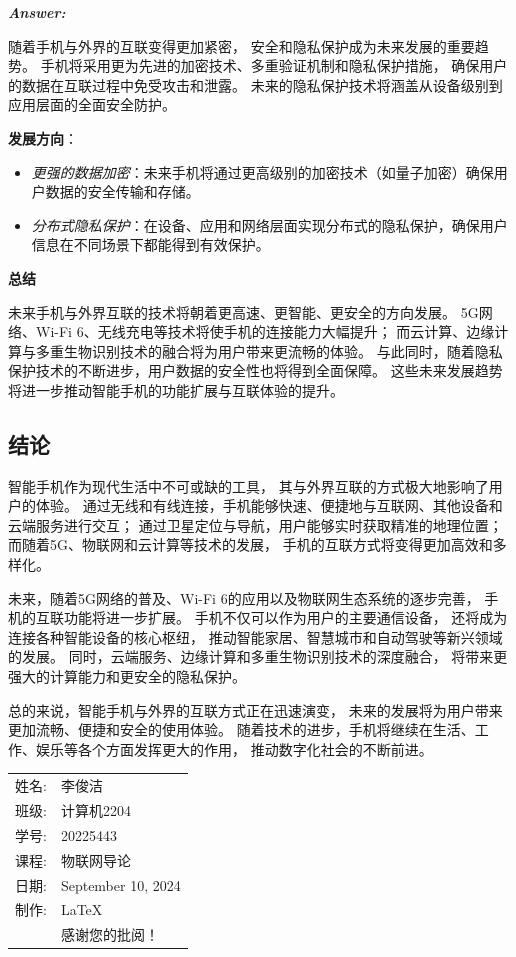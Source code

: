\documentclass[12pt]{article}
\newenvironment{Answer}{
  \vspace{12pt}
  {\large\textbf{\textit{\hspace{-12pt}Answer:}}}\par
  \vspace{8pt}
} {\vspace{24pt}}
\begin{document}
\begin{Answer}
随着手机与外界的互联变得更加紧密，
安全和隐私保护成为未来发展的重要趋势。
手机将采用更为先进的加密技术、多重验证机制和隐私保护措施，
确保用户的数据在互联过程中免受攻击和泄露。
未来的隐私保护技术将涵盖从设备级别到应用层面的全面安全防护。

\textbf{发展方向}：
\begin{itemize}
    \item \textit{更强的数据加密}：未来手机将通过更高级别的加密技术（如量子加密）确保用户数据的安全传输和存储。
    \item \textit{分布式隐私保护}：在设备、应用和网络层面实现分布式的隐私保护，确保用户信息在不同场景下都能得到有效保护。
\end{itemize}

\noindent\textbf{总结}\noindent

未来手机与外界互联的技术将朝着更高速、更智能、更安全的方向发展。
5G网络、Wi-Fi 6、无线充电等技术将使手机的连接能力大幅提升；
而云计算、边缘计算与多重生物识别技术的融合将为用户带来更流畅的体验。
与此同时，随着隐私保护技术的不断进步，用户数据的安全性也将得到全面保障。
这些未来发展趋势将进一步推动智能手机的功能扩展与互联体验的提升。

\subsection*{结论}\noindent

智能手机作为现代生活中不可或缺的工具，
其与外界互联的方式极大地影响了用户的体验。
通过无线和有线连接，手机能够快速、便捷地与互联网、其他设备和云端服务进行交互；
通过卫星定位与导航，用户能够实时获取精准的地理位置；
而随着5G、物联网和云计算等技术的发展，
手机的互联方式将变得更加高效和多样化。

未来，随着5G网络的普及、Wi-Fi 6的应用以及物联网生态系统的逐步完善，
手机的互联功能将进一步扩展。
手机不仅可以作为用户的主要通信设备，
还将成为连接各种智能设备的核心枢纽，
推动智能家居、智慧城市和自动驾驶等新兴领域的发展。
同时，云端服务、边缘计算和多重生物识别技术的深度融合，
将带来更强大的计算能力和更安全的隐私保护。

总的来说，智能手机与外界的互联方式正在迅速演变，
未来的发展将为用户带来更加流畅、便捷和安全的使用体验。
随着技术的进步，手机将继续在生活、工作、娱乐等各个方面发挥更大的作用，
推动数字化社会的不断前进。

\end{Answer}

\begin{flushright}\begin{tabular}{rl}
  姓名: & 李俊洁\\
  班级: & 计算机2204 \\
  学号: & 20225443 \\
  课程: & 物联网导论 \\
  日期: & September 10, 2024 \\
  制作: & \LaTeX \\
  & 感谢您的批阅！
\end{tabular}\end{flushright}
\end{document}
